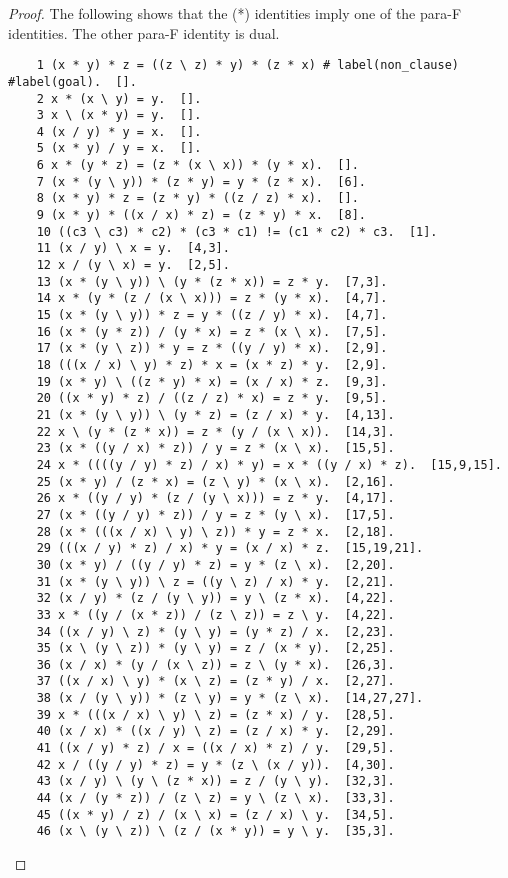\documentclass[12pt]{report}
\theoremstyle{definition}
\begin{document}
\begin{proof}\label{appendix:can1}
  The following shows that the (*) identities imply one of the para-F identities. The other para-F identity is dual.
  \begin{lstlisting}
    1 (x * y) * z = ((z \ z) * y) * (z * x) # label(non_clause) #label(goal).  [].
  	2 x * (x \ y) = y.  [].
  	3 x \ (x * y) = y.  [].
  	4 (x / y) * y = x.  [].
  	5 (x * y) / y = x.  [].
  	6 x * (y * z) = (z * (x \ x)) * (y * x).  [].
  	7 (x * (y \ y)) * (z * y) = y * (z * x).  [6].
  	8 (x * y) * z = (z * y) * ((z / z) * x).  [].
  	9 (x * y) * ((x / x) * z) = (z * y) * x.  [8].
  	10 ((c3 \ c3) * c2) * (c3 * c1) != (c1 * c2) * c3.  [1].
  	11 (x / y) \ x = y.  [4,3].
  	12 x / (y \ x) = y.  [2,5].
  	13 (x * (y \ y)) \ (y * (z * x)) = z * y.  [7,3].
  	14 x * (y * (z / (x \ x))) = z * (y * x).  [4,7].
  	15 (x * (y \ y)) * z = y * ((z / y) * x).  [4,7].
  	16 (x * (y * z)) / (y * x) = z * (x \ x).  [7,5].
  	17 (x * (y \ z)) * y = z * ((y / y) * x).  [2,9].
  	18 (((x / x) \ y) * z) * x = (x * z) * y.  [2,9].
  	19 (x * y) \ ((z * y) * x) = (x / x) * z.  [9,3].
  	20 ((x * y) * z) / ((z / z) * x) = z * y.  [9,5].
  	21 (x * (y \ y)) \ (y * z) = (z / x) * y.  [4,13].
  	22 x \ (y * (z * x)) = z * (y / (x \ x)).  [14,3].
  	23 (x * ((y / x) * z)) / y = z * (x \ x).  [15,5].
  	24 x * ((((y / y) * z) / x) * y) = x * ((y / x) * z).  [15,9,15].
  	25 (x * y) / (z * x) = (z \ y) * (x \ x).  [2,16].
  	26 x * ((y / y) * (z / (y \ x))) = z * y.  [4,17].
  	27 (x * ((y / y) * z)) / y = z * (y \ x).  [17,5].
  	28 (x * (((x / x) \ y) \ z)) * y = z * x.  [2,18].
  	29 (((x / y) * z) / x) * y = (x / x) * z.  [15,19,21].
  	30 (x * y) / ((y / y) * z) = y * (z \ x).  [2,20].
  	31 (x * (y \ y)) \ z = ((y \ z) / x) * y.  [2,21].
  	32 (x / y) * (z / (y \ y)) = y \ (z * x).  [4,22].
  	33 x * ((y / (x * z)) / (z \ z)) = z \ y.  [4,22].
  	34 ((x / y) \ z) * (y \ y) = (y * z) / x.  [2,23].
  	35 (x \ (y \ z)) * (y \ y) = z / (x * y).  [2,25].
  	36 (x / x) * (y / (x \ z)) = z \ (y * x).  [26,3].
  	37 ((x / x) \ y) * (x \ z) = (z * y) / x.  [2,27].
  	38 (x / (y \ y)) * (z \ y) = y * (z \ x).  [14,27,27].
  	39 x * (((x / x) \ y) \ z) = (z * x) / y.  [28,5].
  	40 (x / x) * ((x / y) \ z) = (z / x) * y.  [2,29].
  	41 ((x / y) * z) / x = ((x / x) * z) / y.  [29,5].
  	42 x / ((y / y) * z) = y * (z \ (x / y)).  [4,30].
  	43 (x / y) \ (y \ (z * x)) = z / (y \ y).  [32,3].
  	44 (x / (y * z)) / (z \ z) = y \ (z \ x).  [33,3].
  	45 ((x * y) / z) / (x \ x) = (z / x) \ y.  [34,5].
  	46 (x \ (y \ z)) \ (z / (x * y)) = y \ y.  [35,3].

\end{lstlisting}
\end{proof}
\end{document}
